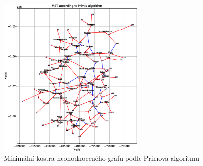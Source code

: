 \begin{figure}[H]
    \centering
    \includegraphics[width=0.65\textwidth]{images/Figure_2.eps}
    \caption{Minimální kostra neohodnoceného grafu podle Primova algoritmu}
\end{figure}

